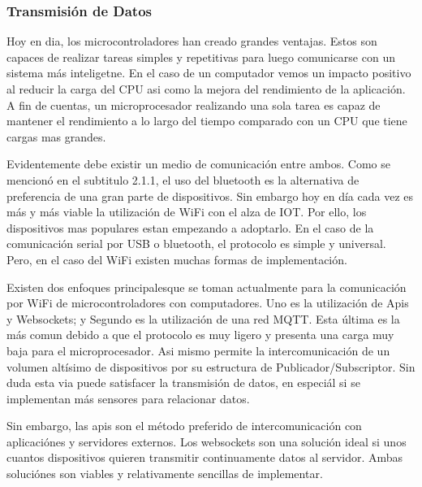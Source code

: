 \documentclass[11pt]{article}
\begin{document}
\subsubsection{Transmisión de Datos}
\label{sec:orga4cc627}
Hoy en dia, los microcontroladores han creado grandes ventajas. Estos son capaces de realizar tareas simples y repetitivas para luego comunicarse con un sistema más inteligetne. En el caso de un computador vemos un impacto positivo al reducir la carga del CPU asi como la mejora del rendimiento de la aplicación. A fin de cuentas, un microprocesador realizando una sola tarea es capaz de mantener el rendimiento a lo largo del tiempo comparado con un CPU que tiene cargas mas grandes.

Evidentemente debe existir un medio de comunicación entre ambos. Como se mencionó en el subtitulo 2.1.1, el uso del bluetooth es la alternativa de preferencia de una gran parte de dispositivos. Sin embargo hoy en día cada vez es más y más viable la utilización de WiFi con el alza de IOT. Por ello, los dispositivos mas populares estan empezando a adoptarlo. En el caso de la comunicación serial por USB o bluetooth, el protocolo es simple y universal. Pero, en el caso del WiFi existen muchas formas de implementación.

Existen dos enfoques principalesque se toman actualmente para la comunicación por WiFi de microcontroladores con computadores. Uno es la utilización de Apis y Websockets; y Segundo es la utilización de una red MQTT. Esta última es la más comun debido a que el protocolo es muy ligero y presenta una carga muy baja para el microprocesador. Asi mismo permite la intercomunicación de un volumen altísimo de dispositivos por su estructura de Publicador/Subscriptor. Sin duda esta via puede satisfacer la transmisión de datos, en especiál si se implementan más sensores para relacionar datos.

Sin embargo, las apis son el método preferido de intercomunicación con aplicaciónes y servidores externos. Los websockets son una solución ideal si unos cuantos dispositivos quieren transmitir continuamente datos al servidor. Ambas soluciónes son viables y relativamente sencillas de implementar.
\end{document}
